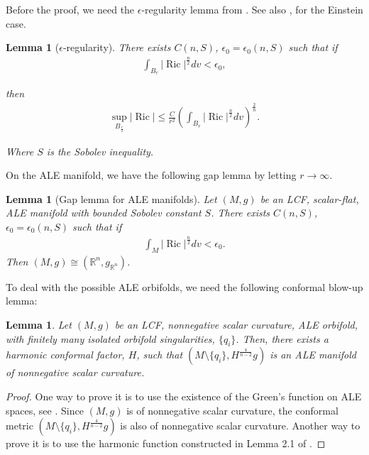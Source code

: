 \documentclass[12pt]{amsart}
\newtheorem{lemma}[theorem]{Lemma}
\theoremstyle{definition}
\begin{document}
Before the proof, we need the $\epsilon$-regularity lemma from \cite{TV2}. See also \cite{And89}, \cite{BKN} for the Einstein case.

\begin{lemma}[$\epsilon$-regularity]\label{epsilon regularity}
    There exists $C(n, S)$, $\epsilon_0=\epsilon_0(n,S)$ such that if 
  \begin{align*}
      \int_{B_r}|\operatorname{Ric}|^{\frac{n}{2}}dv<\epsilon_0,
  \end{align*}
  
  then
  \begin{align*}
      \operatorname{sup}_{B_{\frac{r}{2}}}|\operatorname{Ric}|\leq \frac{C}{r^2}(\int_{B_r}|\operatorname{Ric}|^{\frac{n}{2}}dv)^{\frac{2}{n}}.
  \end{align*}

  Where $S$ is the Sobolev inequality.
\end{lemma}

On the ALE manifold, we have the following gap lemma by letting $r\to \infty$.

\begin{lemma}[Gap lemma for ALE manifolds]\label{gap ALE}
Let $(M,g)$ be an LCF, scalar-flat, ALE manifold with bounded Sobolev constant $S$. There exists $C(n, S)$, $\epsilon_0=\epsilon_0(n,S)$ such that if 
  \begin{align*}
      \int_M|\operatorname{Ric}|^{\frac{n}{2}}dv<\epsilon_0.
  \end{align*}
Then $(M,g)\cong (\mathbb{R}^n , g_{\mathbb{R}^n})$.
\end{lemma}

To deal with the possible ALE orbifolds, we need the following conformal blow-up lemma:

\begin{lemma}\label{ALE orbifold blow-up}
    Let $(M,g)$ be an LCF, nonnegative scalar curvature, ALE orbifold, with finitely many isolated orbifold singularities, $\{q_i\}$. Then, there exists a harmonic conformal factor, $H$, such that $(M\setminus\{q_i\}, H^{\frac{4}{n-2}}g)$ is an ALE manifold of nonnegative scalar curvature.
\end{lemma}
\begin{proof}
    One way to prove it is to use the existence of the Green's function on ALE spaces, see \cite{grigor1999analytic}. Since $(M,g)$ is of nonnegative scalar curvature, the conformal metric $(M\setminus\{q_i\}, H^{\frac{4}{n-2}}g)$ is also of nonnegative scalar curvature. Another way to prove it is to use the harmonic function constructed in Lemma 2.1 of \cite{ju2023conformally}.
\end{proof}
\end{document}

